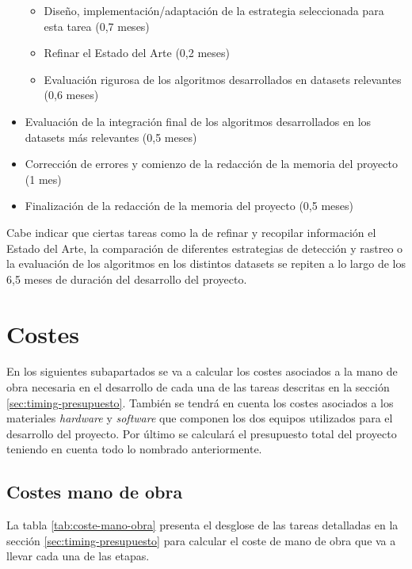 \begin{itemize}
    \begin{itemize}
        \item Diseño, implementación/adaptación de la estrategia seleccionada para esta tarea (0,7 meses)
        \item Refinar el Estado del Arte (0,2 meses)
        \item Evaluación rigurosa de los algoritmos desarrollados en datasets relevantes (0,6 meses)
    \end{itemize}
    
    \item Evaluación de la integración final de los algoritmos desarrollados en los datasets más relevantes (0,5 meses)
    
    \item Corrección de errores y comienzo de la redacción de la memoria del proyecto (1 mes)
    
    \item Finalización de la redacción de la memoria del proyecto (0,5 meses)
\end{itemize}

Cabe indicar que ciertas tareas como la de refinar y recopilar información el Estado del Arte, la comparación de diferentes estrategias de detección y rastreo o la evaluación de los algoritmos en los distintos datasets se repiten a lo largo de los 6,5 meses de duración del desarrollo del proyecto.

\section{Costes}
\label{sec:costes-presupuesto}

En los siguientes subapartados se va a calcular los costes asociados a la mano de obra necesaria en el desarrollo de cada una de las tareas descritas en la sección \ref{sec:timing-presupuesto}. También se tendrá en cuenta los costes asociados a los materiales \textit{hardware} y \textit{software} que componen los dos equipos utilizados para el desarrollo del proyecto. Por último se calculará el presupuesto total del proyecto teniendo en cuenta todo lo nombrado anteriormente.

\subsection{Costes mano de obra}
\label{subsec:costes-mano-obra}

La tabla \ref{tab:coste-mano-obra} presenta el desglose de las tareas detalladas en la sección \ref{sec:timing-presupuesto} para calcular el coste de mano de obra que va a llevar cada una de las etapas.

